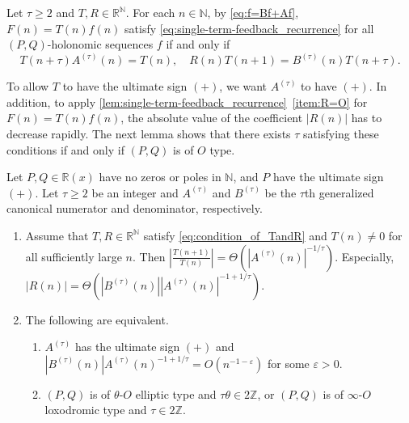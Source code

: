 \documentclass[a4paper,UKenglish,cleveref,autoref,thm-restate]{lipics-v2021}
\newcommand{\R}{\mathbb{R}}
\newcommand{\N}{\mathbb{N}}
\newcommand{\Z}{\mathbb{Z}}
\begin{document}
Let $\tau \geq 2$ and $T, R \in \R^{\N}$. For each $n \in \N$, by \cref{eq:f=Bf+Af}, $F(n) = T(n)f(n)$ satisfy \cref{eq:single-term-feedback_recurrence} for all $(P, Q)$-holonomic sequences $f$ if and only if 
\begin{equation} \label{eq:condition_of_TandR}
T(n+\tau) A^{(\tau)}(n) = T(n), \quad R(n)T(n+1) = B^{(\tau)}(n) T(n+\tau).
\end{equation} 

To allow $T$ to have the ultimate sign $(+)$, 
we want $A^{(\tau)}$ to have $(+)$. 
In addition, to apply \cref{lem:single-term-feedback_recurrence}~\eqref{item:R=O} for $F(n) = T(n)f(n)$, the absolute value of the coefficient $|R(n)|$ has to decrease rapidly. The next lemma shows that there exists $\tau$ satisfying these conditions if and only if $(P, Q)$ is of $O$ type. 

\begin{lemma} \label{lem:transformation_property}
Let $P, Q \in \R(x)$ have no zeros or poles in $\N$, and $P$ have the ultimate sign $(+)$. Let $\tau \geq 2$ be an integer and $A^{(\tau)}$ and $B^{(\tau)}$ be the $\tau$th generalized canonical numerator and denominator, respectively. 
\begin{enumerate}[(1)]
\item \label{item:condition_of_TandR} 
Assume that $T, R \in \R^{\N}$ satisfy \eqref{eq:condition_of_TandR} and $T(n) \neq 0$ for all sufficiently large $n$. Then $\left| \frac{T(n+1)}{T(n)} \right| = \Theta(|A^{(\tau)}(n)|^{-1 / \tau})$. Especially, $|R(n)| = \Theta \left( |B^{(\tau)}(n)||A^{(\tau)}(n)|^{-1+1/\tau} \right)$. 

\item \label{item:A>0andB/A=n^-1-epsilon_iff_Otype_and_tautheta_in_2Z}
The following are equivalent. 
\begin{enumerate}[(\ref{item:A>0andB/A=n^-1-epsilon_iff_Otype_and_tautheta_in_2Z}a)]
\item \label{item:A>0andB/A=n^-1-epsilon}
$A^{(\tau)}$ has the ultimate sign $(+)$ and $|B^{(\tau)}(n)|  A^{(\tau)} (n)^{-1+1/\tau} = O(n^{-1-\varepsilon})$ for some $\varepsilon > 0$. 

\item \label{item:Otype_and_tautheta_in_2Z}
$(P, Q)$ is of $\theta$-$O$ elliptic type and $\tau \theta \in 2 \Z$, or $(P, Q)$ is of $\infty$-$O$ loxodromic type and $\tau \in 2 \Z$. 
\end{enumerate}
\end{enumerate}
\end{lemma}
\end{document}
